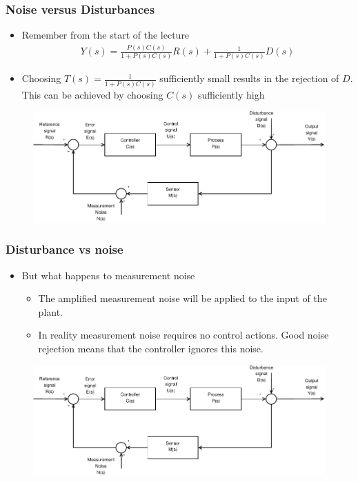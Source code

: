 \begin{frame}
	\frametitle{Noise versus Disturbances}
	\begin{block}{}
		\begin{itemize}
			\item Remember from the start of the lecture
			\begin{align*}
				Y(s) = \frac{P(s)C(s)}{1+P(s)C(s)}R(s) + \frac{1}{1+P(s)C(s)}D(s)
			\end{align*}
			\item Choosing $T(s)=\frac{1}{1+P(s)C(s)}$ sufficiently small results in the rejection of $D$. This can be achieved by choosing $C(s)$ sufficiently high
		\end{itemize}
		\vspace{-2em}
		\begin{figure}
			\centering
			\includegraphics[width=0.7\linewidth]{Closed-Loop-measure}
			\label{fig:Closed-Loop4}
		\end{figure}
	\end{block}
\end{frame}


\begin{frame}
	\frametitle{Disturbance vs noise}
	\begin{block}{}
		\begin{itemize}
			\item But what happens to measurement noise
			\begin{itemize}
				\item The amplified measurement noise will be applied to the input of the plant.
				\item In reality measurement noise requires no control actions. Good noise rejection means that the controller ignores this noise.
			\end{itemize}
		\end{itemize}
		\begin{figure}
			\centering
			\includegraphics[width=0.8\linewidth]{Closed-Loop-measure}
			\label{fig:Closed-Loop5}
		\end{figure}
	\end{block}
\end{frame}


